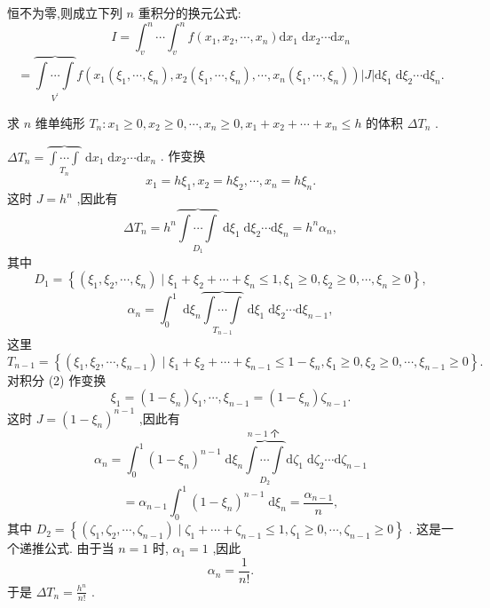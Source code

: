 恒不为零,则成立下列 \(n\) 重积分的换元公式:
\[
I = {\int }_{v}^{n}\cdots {\int }_{v}^{n}f\left( {{x}_{1},{x}_{2},\cdots ,{x}_{n}}\right) \mathrm{d}{x}_{1}\mathrm{\;d}{x}_{2}\cdots \mathrm{d}{x}_{n}
\]
\[
= \underset{{V}^{\prime }}{\overbrace{\int \cdots \int }}f\left( {{x}_{1}\left( {{\xi }_{1},\cdots ,{\xi }_{n}}\right) ,{x}_{2}\left( {{\xi }_{1},\cdots ,{\xi }_{n}}\right) ,\cdots ,{x}_{n}\left( {{\xi }_{1},\cdots ,{\xi }_{n}}\right) }\right) \left| J\right| \mathrm{d}{\xi }_{1}\mathrm{\;d}{\xi }_{2}\cdots \mathrm{d}{\xi }_{n}.
\]
\begin{example}

\end{example}
求 \(n\) 维单纯形 \({T}_{n} : {x}_{1} \geq  0,{x}_{2} \geq  0,\cdots ,{x}_{n} \geq  0,{x}_{1} + {x}_{2} + \cdots  + {x}_{n} \leq  h\) 的体积 \(\Delta {T}_{n}\) .

\begin{solution}

\end{solution}
\(\Delta {T}_{n} = \underset{{T}_{n}}{\overbrace{\int \cdots \int }}\mathrm{\;d}{x}_{1}\mathrm{\;d}{x}_{2}\cdots \mathrm{d}{x}_{n}\) . 作变换
\[
{x}_{1} = h{\xi }_{1},{x}_{2} = h{\xi }_{2},\cdots ,{x}_{n} = h{\xi }_{n}.
\]
这时 \(J = {h}^{n}\) ,因此有
\[
\Delta {T}_{n} = {h}^{n}\underset{{D}_{1}}{\overbrace{\int \cdots \int }}\mathrm{\;d}{\xi }_{1}\mathrm{\;d}{\xi }_{2}\cdots \mathrm{d}{\xi }_{n} = {h}^{n}{\alpha }_{n},
\]
其中
\[
{D}_{1} = \left\{  {\left( {{\xi }_{1},{\xi }_{2},\cdots ,{\xi }_{n}}\right)  \mid  {\xi }_{1} + {\xi }_{2} + \cdots  + {\xi }_{n} \leq  1,{\xi }_{1} \geq  0,{\xi }_{2} \geq  0,\cdots ,{\xi }_{n} \geq  0}\right\}  ,
\]
\[
{\alpha }_{n} = {\int }_{0}^{1}\mathrm{\;d}{\xi }_{n}\underset{{T}_{n - 1}}{\overbrace{\int \cdots \int }}\mathrm{\;d}{\xi }_{1}\mathrm{\;d}{\xi }_{2}\cdots \mathrm{d}{\xi }_{n - 1}, \tag{2}
\]
这里
\[
{T}_{n - 1} = \left\{  {\left( {{\xi }_{1},{\xi }_{2},\cdots ,{\xi }_{n - 1}}\right)  \mid  {\xi }_{1} + {\xi }_{2} + \cdots  + {\xi }_{n - 1} \leq  1 - {\xi }_{n},{\xi }_{1} \geq  0,{\xi }_{2} \geq  0,\cdots ,{\xi }_{n - 1} \geq  0}\right\}  .
\]
对积分 (2) 作变换
\[
{\xi }_{1} = \left( {1 - {\xi }_{n}}\right) {\zeta }_{1},\cdots ,{\xi }_{n - 1} = \left( {1 - {\xi }_{n}}\right) {\zeta }_{n - 1}.
\]
这时 \(J = {\left( 1 - {\xi }_{n}\right) }^{n - 1}\) ,因此有
\[
{\alpha }_{n} = {\int }_{0}^{1}{\left( 1 - {\xi }_{n}\right) }^{n - 1}\mathrm{\;d}{\xi }_{n}\underset{{D}_{2}}{\overset{n - 1\text{ 个 }}{\overbrace{\int \cdots \int }}}\mathrm{d}{\zeta }_{1}\mathrm{\;d}{\zeta }_{2}\cdots \mathrm{d}{\zeta }_{n - 1}
\]
\[
= {\alpha }_{n - 1}{\int }_{0}^{1}{\left( 1 - {\xi }_{n}\right) }^{n - 1}\mathrm{\;d}{\xi }_{n} = \frac{{\alpha }_{n - 1}}{n},
\]
其中 \({D}_{2} = \left\{  {\left( {{\zeta }_{1},{\zeta }_{2},\cdots ,{\zeta }_{n - 1}}\right)  \mid  {\zeta }_{1} + \cdots  + {\zeta }_{n - 1} \leq  1,{\zeta }_{1} \geq  0,\cdots ,{\zeta }_{n - 1} \geq  0}\right\}\) . 这是一个递推公式. 由于当 \(n = 1\) 时, \({\alpha }_{1} = 1\) ,因此
\[
{\alpha }_{n} = \frac{1}{n!}.
\]
于是 \(\Delta {T}_{n} = \frac{{h}^{n}}{n!}\) .

